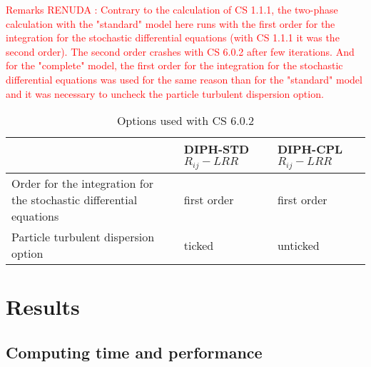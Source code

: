 \documentclass[a4paper,twoside,12pt]{article}
\begin{document}
\begin{description}
\begin{itemize}
         \end{itemize}

\textcolor{red}{Remarks RENUDA : Contrary to the calculation of CS 1.1.1, the two-phase calculation with the "standard" model here runs with the first order for the integration for the stochastic differential equations (with CS 1.1.1 it was the second order). The second order crashes with CS 6.0.2 after few iterations. And for the "complete" model, the first order for the integration for the stochastic differential equations was used for the same reason than for the "standard" model and it was necessary to uncheck the particle turbulent dispersion option. }


         \begin{table}[H]
            \begin{center}
               \begin{tabular}{|p{50mm}|p{50mm}|p{50mm}|}
                  \hline
								 	& DIPH-STD $R_{ij}-LRR$	& DIPH-CPL $R_{ij}-LRR$ \\ \hline
Order for the integration for the stochastic differential equations	& first order		& first order \\ \hline
Particle turbulent dispersion option					& ticked		& unticked \\
                  \hline
               \end{tabular}
               \caption{Options used with CS 6.0.2}
               \label{tab_capteur}
            \end{center}
         \end{table}



\end{description}

\section{Results}

\subsection{Computing time and performance}
\end{document}
